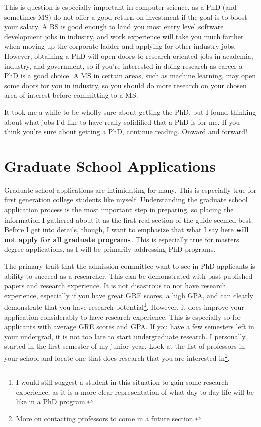\documentclass[12pt]{article}
\begin{document}
This is question is especially important in computer science, as a PhD (and sometimes MS) do not offer a good return on investment if the goal is to boost your salary. A BS is good enough to land you most entry level software development jobs in industry, and work experience will take you much farther when moving up the corporate ladder and applying for other industry jobs. However, obtaining a PhD will open doors to research oriented jobs in academia, industry, and government, so if you're interested in doing research as career a PhD is a good choice. \cite{robertsonwebsite} A MS in certain areas, such as machine learning, may open some doors for you in industry, so you should do more research on your chosen area of interest before committing to a MS.

It took me a while to be wholly sure about getting the PhD, but I found thinking about what jobs I'd like to have really solidified that a PhD is for me. If you think you're sure about getting a PhD, continue reading. Onward and forward!

\section{Graduate School Applications}

Graduate school applications are intimidating for many. This is especially true for first generation college students like myself. Understanding the graduate school application process is the most important step in preparing, so placing the information I gathered about it as the first real section of the guide seemed best. Before I get into details, though, I want to emphasize that what I say here \textbf{will not apply for all graduate programs}. This is especially true for masters degree applications, as I will be primarily addressing PhD programs.

The primary trait that the admission committee want to see in PhD applicants is ability to succeed as a researcher. This can be demonstrated with past published papers and research experience. It is not disastrous to not have research experience, especially if you have great GRE scores, a high GPA, and can clearly demonstrate that you have research potential\footnote{I would still suggest a student in this situation to gain some research experience, as it is a more clear representation of what day-to-day life will be like in a PhD program.}. However, it does improve your application considerably to have research experience. This is especially so for applicants with average GRE scores and GPA. If you have a few semesters left in your undergrad, it is not too late to start undergraduate research. I personally started in the first semester of my junior year. Look at the list of professors in your school and locate one that does research that you are interested in\footnote{More on contacting professors to come in a future section.}.
\end{document}
